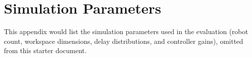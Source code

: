 \chapter{Simulation Parameters}
\label{app:simparams}

This appendix would list the simulation parameters used in the evaluation
(robot count, workspace dimensions, delay distributions, and controller
gains), omitted from this starter document.

